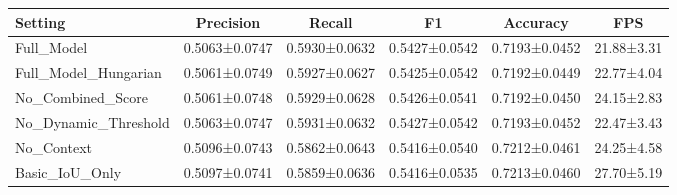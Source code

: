 \begin{tabular}{lccccc}
\toprule
Setting & Precision & Recall & F1 & Accuracy & FPS \\
\midrule
Full_Model & 0.5063±0.0747 & 0.5930±0.0632 & 0.5427±0.0542 & 0.7193±0.0452 & 21.88±3.31 \\
Full_Model_Hungarian & 0.5061±0.0749 & 0.5927±0.0627 & 0.5425±0.0542 & 0.7192±0.0449 & 22.77±4.04 \\
No_Combined_Score & 0.5061±0.0748 & 0.5929±0.0628 & 0.5426±0.0541 & 0.7192±0.0450 & 24.15±2.83 \\
No_Dynamic_Threshold & 0.5063±0.0747 & 0.5931±0.0632 & 0.5427±0.0542 & 0.7193±0.0452 & 22.47±3.43 \\
No_Context & 0.5096±0.0743 & 0.5862±0.0643 & 0.5416±0.0540 & 0.7212±0.0461 & 24.25±4.58 \\
Basic_IoU_Only & 0.5097±0.0741 & 0.5859±0.0636 & 0.5416±0.0535 & 0.7213±0.0460 & 27.70±5.19 \\
\bottomrule
\end{tabular}
